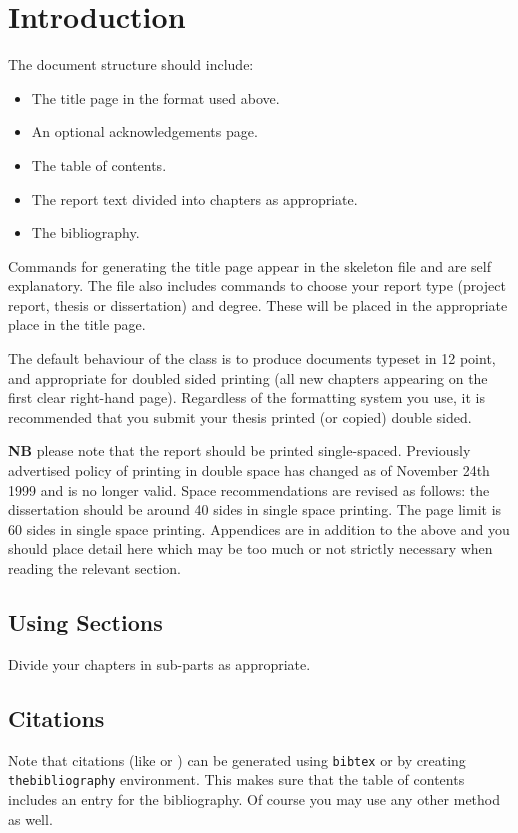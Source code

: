 \chapter{Introduction}

The document structure should include:
\begin{itemize}
\item
The title page  in the format used above.
\item
An optional acknowledgements page.
\item
The table of contents.
\item
The report text divided into chapters as appropriate.
\item
The bibliography.
\end{itemize}

Commands for generating the title page appear in the skeleton file and
are self explanatory.
The file also includes commands to choose your report type (project
report, thesis or dissertation) and degree.
These will be placed in the appropriate place in the title page. 

The default behaviour of the class is to produce documents typeset in
12 point, 
and appropriate for doubled sided printing
(all new chapters appearing on the first clear right-hand page).
Regardless of the formatting system you use, 
it is recommended that you submit your thesis printed (or copied) 
double sided. 

{\bf NB} please note that the report should be printed single-spaced.
Previously advertised policy of printing in double space has changed
as of November 24th 1999 and is no longer valid.
Space recommendations are revised as follows: 
the dissertation should be around 40 sides in single space printing.
The page limit is 60 sides in single space printing.  Appendices are in
addition to the above and you should place detail here which may be too
much or not strictly necessary when reading the relevant section.

\section{Using Sections}

Divide your chapters in sub-parts as appropriate.

\section{Citations}

Note that citations 
(like \cite{P1} or \cite{P2})
can be generated using {\tt bibtex} or by
creating {\tt thebibliography} environment. This makes sure that the
table of contents includes an entry for the bibliography.
Of course you may use any other method as well.

